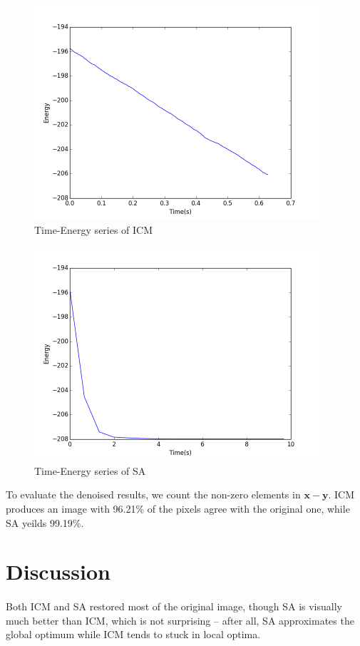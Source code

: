 \documentclass{article}
\begin{document}
\begin{figure}[H]
\centering
\includegraphics[width=300pt]{../img/ICM-energy-time.png}
\caption{Time-Energy series of ICM}
\end{figure}

\begin{figure}[H]
\centering
\includegraphics[width=300pt]{../img/SA-energy-time.png}
\caption{Time-Energy series of SA}
\end{figure}
To evaluate the denoised results, we count the non-zero elements in $\mathbf{x} - \mathbf{y}$. ICM produces an image with  96.21\% of the pixels agree with the original one, while SA yeilds 99.19\%.

\section{Discussion}
\paragraph{}
Both ICM and SA restored most of the original image, though SA is visually much better than ICM, which is not surprising -- after all, SA approximates the global optimum while ICM tends to stuck in local optima.
\end{document}
